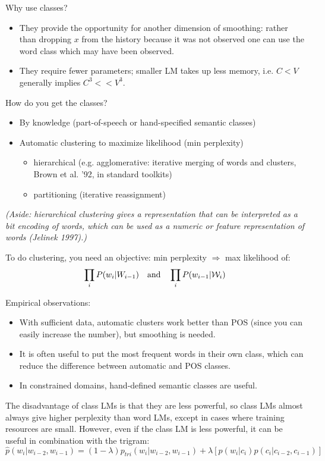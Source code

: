 \documentclass[11pt,titlepage]{article}
\begin{document}
\clearpage
Why use classes?  
\begin{itemize}
\item They provide the opportunity for another dimension
of smoothing: rather than dropping $x$ from the history because it was
not observed one can use the word class which may have been observed.
\item They require fewer parameters; smaller LM takes up less memory,
i.e. $C<V$ generally implies $C^3<<V^3$.
\end{itemize}

How do you get the classes?
\begin{itemize}
\item By knowledge (part-of-speech or hand-specified semantic classes)
\item Automatic clustering to maximize likelihood (min perplexity)
\begin{itemize}
\item hierarchical (e.g. agglomerative: iterative merging of words and clusters, Brown et al. '92, in standard toolkits)
\item partitioning (iterative reassignment)
\end{itemize}
\end{itemize}

{\sl
(Aside: hierarchical clustering gives a representation that can be interpreted as a bit encoding of words, which can be used as a numeric or feature representation of words (Jelinek 1997).)}

\vskip 0.2in

To do clustering, you need an objective:  min perplexity  $\Longrightarrow$ max likelihood of:
$$\prod_i P(w_i|W_{i-1}) \quad \mbox{and} \quad \prod_i P(w_{i-1}|{\cal W}_i)$$


\clearpage

Empirical observations: 
\begin{itemize}
\item With sufficient data, automatic clusters work better than POS (since you can easily increase the number), but smoothing is needed.
\item It is often useful to put the most frequent words in their own class, which can reduce the difference between automatic and POS classes.
\item In constrained domains, hand-defined semantic classes are useful.
\end{itemize}


\vskip 0.2in

The disadvantage of class LMs is that they are less powerful, so class LMs
almost always give higher perplexity than word LMs, except in cases
where training resources are small.  However, even if the class LM is less
powerful, it can be useful in combination with the trigram:
$$\hat p(w_i|w_{i-2},w_{i-1}) = (1-\lambda) p_{tri}(w_i|w_{i-2},w_{i-1}) + \lambda[p(w_i|c_i) p(c_i|c_{i-2},c_{i-1})] $$
\end{document}
